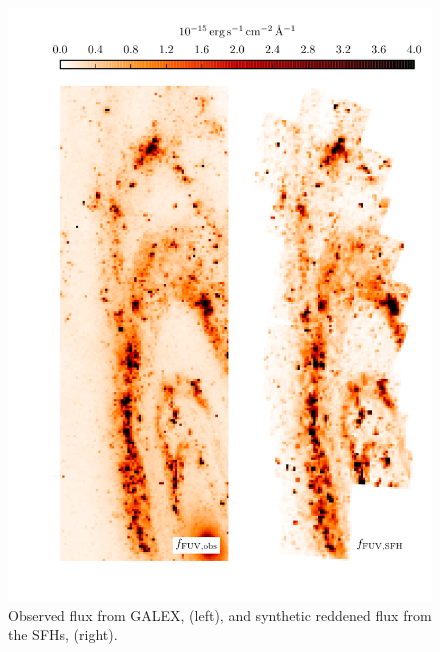 \begin{figure}
\centering
\includegraphics[width=\textwidth]{m31flux-figures/fluxmaps_fuv.pdf}
\caption[Observed and synthetic reddened \fuv{} flux maps.]{Observed \fuv{} flux from
    GALEX, \ffuvobs{} (left), and synthetic reddened \fuv{} flux from the SFHs,
    \ffuvsfh{} (right).
}
\label{fig:mfx:fluxmaps_fuv}
\end{figure}


